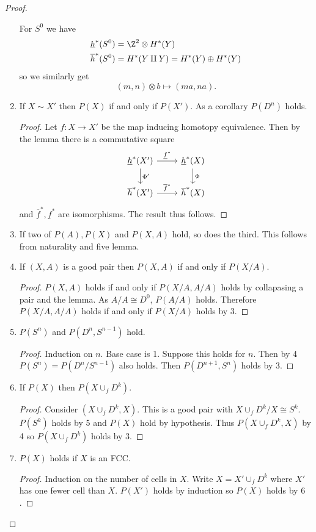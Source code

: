 \documentclass[a4paper]{article}
\begin{document}
\begin{proof}
\begin{enumerate}
    For \(S^0\) we have
    \begin{align*}
      \underline h^*(S^0) &= \Z^2 \otimes H^*(Y) \\
      \overline h^*(S^0) &= H^*(Y \amalg Y) = H^*(Y) \oplus H^*(Y)
    \end{align*}
    so we similarly get
    \[
      (m, n) \otimes b \mapsto (ma, na).
    \]
  \item If \(X \sim X'\) then \(P(X)\) if and only if \(P(X')\). As a corollary \(P(D^n)\) holds.

    \begin{proof}
      Let \(f: X \to X'\) be the map inducing homotopy equivalence. Then by the lemma there is a commutative square
      \[
        \begin{tikzcd}
          \underline h^*(X') \ar[r, "\underline f^*"] \ar[d, "\Phi'"] & \underline h^*(X) \ar[d, "\Phi"] \\
          \overline h^*(X') \ar[r, "\overline f^*"] & \overline h^*(X)
        \end{tikzcd}
      \]
      and \(\overline f^*, \underline f^*\) are isomorphisms. The result thus follows.
    \end{proof}
  \item If two of \(P(A), P(X)\) and \(P(X, A)\) hold, so does the third. This follows from naturality and five lemma.
  \item If \((X, A)\) is a good pair then \(P(X, A)\) if and only if \(P(X/A)\).

    \begin{proof}
      \(P(X, A)\) holds if and only if \(P(X/A, A/A)\) holds by collapasing a pair and the lemma. As \(A/A \cong D^0\), \(P(A/A)\) holds. Therefore \(P(X/A, A/A)\) holds if and only if \(P(X/A)\) holds by 3.
    \end{proof}
  \item \(P(S^n)\) and \(P(D^n, S^{n - 1})\) hold.

    \begin{proof}
      Induction on \(n\). Base case is 1. Suppose this holds for \(n\). Then by 4 \(P(S^n) = P(D^n/S^{n - 1})\) also holds. Then \(P(D^{n + 1}, S^n)\) holds by 3.
    \end{proof}

  \item If \(P(X)\) then \(P(X \cup_f D^k)\).

    \begin{proof}
      Consider \((X \cup_f D^k, X)\). This is a good pair with \(X \cup_f D^k/X \cong S^k\). \(P(S^k)\) holds by 5 and \(P(X)\) hold by hypothesis. Thus \(P(X \cup_f D^k, X)\) by 4 so \(P(X \cup_f D^k)\) holds by 3.
    \end{proof}
  \item \(P(X)\) holds if \(X\) is an FCC.

    \begin{proof}
      Induction on the number of cells in \(X\). Write \(X = X' \cup_f D^k\) where \(X'\) has one fewer cell than \(X\). \(P(X')\) holds by induction so \(P(X)\) holds by \(6\).
    \end{proof}
  \end{enumerate}
\end{proof}
\end{document}
